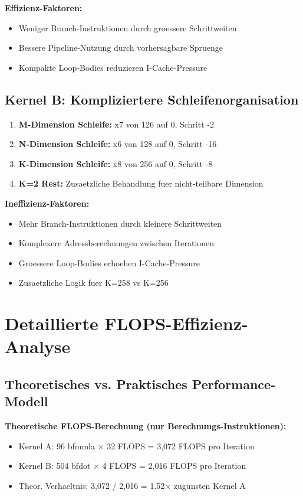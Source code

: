 \documentclass[11pt,a4paper]{article}
\begin{document}
\textbf{Effizienz-Faktoren:}
\begin{itemize}
\item Weniger Branch-Instruktionen durch groessere Schrittweiten
\item Bessere Pipeline-Nutzung durch vorhersagbare Spruenge
\item Kompakte Loop-Bodies reduzieren I-Cache-Pressure
\end{itemize}

\subsection{Kernel B: Kompliziertere Schleifenorganisation}

\begin{enumerate}
\item \textbf{M-Dimension Schleife:} x7 von 126 auf 0, Schritt -2
\item \textbf{N-Dimension Schleife:} x6 von 128 auf 0, Schritt -16
\item \textbf{K-Dimension Schleife:} x8 von 256 auf 0, Schritt -8  
\item \textbf{K=2 Rest:} Zusaetzliche Behandlung fuer nicht-teilbare Dimension
\end{enumerate}

\textbf{Ineffizienz-Faktoren:}
\begin{itemize}
\item Mehr Branch-Instruktionen durch kleinere Schrittweiten
\item Komplexere Adressberechnungen zwischen Iterationen
\item Groessere Loop-Bodies erhoehen I-Cache-Pressure
\item Zusaetzliche Logik fuer K=258 vs K=256
\end{itemize}

\section{Detaillierte FLOPS-Effizienz-Analyse}

\subsection{Theoretisches vs. Praktisches Performance-Modell}

\textbf{Theoretische FLOPS-Berechnung (nur Berechnungs-Instruktionen):}
\begin{itemize}
\item Kernel A: 96 bfmmla $\times$ 32 FLOPS = 3,072 FLOPS pro Iteration
\item Kernel B: 504 bfdot $\times$ 4 FLOPS = 2,016 FLOPS pro Iteration
\item Theor. Verhaeltnis: 3,072 / 2,016 = 1.52$\times$ zugunsten Kernel A
\end{itemize}
\end{document}
